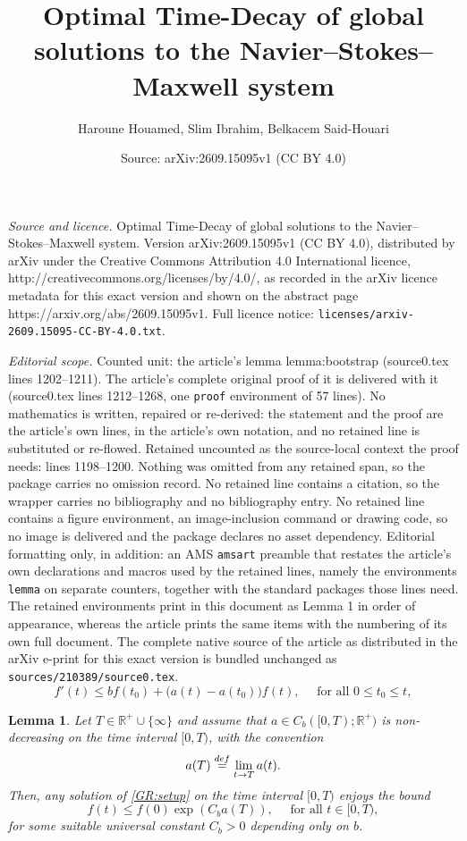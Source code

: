 \documentclass[10pt,a4paper]{amsart}
\title{Optimal Time-Decay of global solutions to the Navier--Stokes--Maxwell system}
\author{Haroune Houamed, Slim Ibrahim, Belkacem Said-Houari}
\date{Source: arXiv:2609.15095v1 (CC BY 4.0)}
\newtheorem{lemma}{Lemma}
\newcommand*{\bydef}{\overset{\rm def}{=}}
\begin{document}
\maketitle

\noindent\emph{Source and licence.} Optimal Time-Decay of global solutions to the Navier--Stokes--Maxwell system. Version arXiv:2609.15095v1 (CC BY 4.0), distributed by arXiv under the Creative Commons Attribution 4.0 International licence, http://creativecommons.org/licenses/by/4.0/, as recorded in the arXiv licence metadata for this exact version and shown on the abstract page https://arxiv.org/abs/2609.15095v1. Full licence notice: \texttt{licenses/arxiv-2609.15095-CC-BY-4.0.txt}.\par\smallskip

\noindent\textit{Editorial scope.} Counted unit: the article's lemma lemma:bootstrap (source0.tex lines 1202--1211). The article's complete original proof of it is delivered with it (source0.tex lines 1212--1268, one \texttt{proof} environment of 57 lines). No mathematics is written, repaired or re-derived: the statement and the proof are the article's own lines, in the article's own notation, and no retained line is substituted or re-flowed.  Retained uncounted as the source-local context the proof needs: lines 1198--1200.  Nothing was omitted from any retained span, so the package carries no omission record.  No retained line contains a citation, so the wrapper carries no bibliography and no bibliography entry.  No retained line contains a figure environment, an image-inclusion command or drawing code, so no image is delivered and the package declares no asset dependency.  Editorial formatting only, in addition: an AMS \texttt{amsart} preamble that restates the article's own declarations and macros used by the retained lines, namely the environments \texttt{lemma} on separate counters, together with the standard packages those lines need.  The retained environments print in this document as Lemma 1 in order of appearance, whereas the article prints the same items with the numbering of its own full document.  The complete native source of the article as distributed in the arXiv e-print for this exact version is bundled unchanged as \texttt{sources/210389/source0.tex}.
\begin{equation}\label{GR:setup}
	f'(t) \leq bf(t_0) + \big(a(t) -a(t_0)\big) f(t), \quad \text{ for all } 0\leq t_0 \leq t,
\end{equation}

\begin{lemma}\label{lemma:bootstrap} Let $T\in \mathbb R^+\cup \{ \infty\}$ and  assume that $a\in C_b([0,T); \mathbb R^+)$ is non-decreasing on the time interval $[0,T)$, with the convention 
\begin{equation*}
	a(T)\bydef \lim_{t\to T} a(t).
\end{equation*}
	Then, any solution of \eqref{GR:setup} on the time interval $[0,T)$ enjoys the bound
	\begin{equation*}
		f(t) \leq f(0) \exp \left( C_b   a(T)\right), \quad \text{ for all } t \in [0,T),
	\end{equation*}
	for some suitable universal constant $C_b>0$ depending only on $b$.
\end{lemma}
\end{document}
